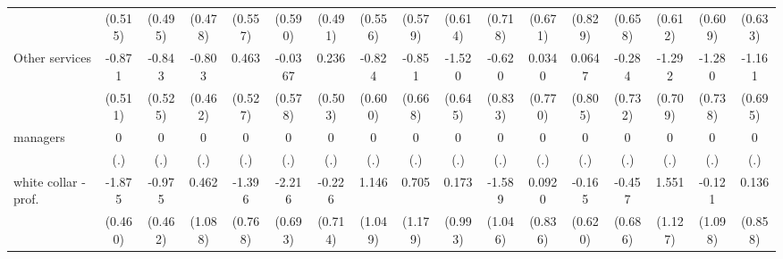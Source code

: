 {\begin{tabular}{l*{16}{c}}
                    &     (0.515)         &     (0.495)         &     (0.478)         &     (0.557)         &     (0.590)         &     (0.491)         &     (0.556)         &     (0.579)         &     (0.614)         &     (0.718)         &     (0.671)         &     (0.829)         &     (0.658)         &     (0.612)         &     (0.609)         &     (0.633)         \\
[1em]
Other services      &      -0.871         &      -0.843         &      -0.803         &       0.463         &     -0.0367         &       0.236         &      -0.824         &      -0.851         &      -1.520\sym{*}  &      -0.620         &      0.0340         &      0.0647         &      -0.284         &      -1.292         &      -1.280         &      -1.161         \\
                    &     (0.511)         &     (0.525)         &     (0.462)         &     (0.527)         &     (0.578)         &     (0.503)         &     (0.600)         &     (0.668)         &     (0.645)         &     (0.833)         &     (0.770)         &     (0.805)         &     (0.732)         &     (0.709)         &     (0.738)         &     (0.695)         \\
[1em]
managers            &           0         &           0         &           0         &           0         &           0         &           0         &           0         &           0         &           0         &           0         &           0         &           0         &           0         &           0         &           0         &           0         \\
                    &         (.)         &         (.)         &         (.)         &         (.)         &         (.)         &         (.)         &         (.)         &         (.)         &         (.)         &         (.)         &         (.)         &         (.)         &         (.)         &         (.)         &         (.)         &         (.)         \\
[1em]
white collar - prof.&      -1.875\sym{***}&      -0.975\sym{*}  &       0.462         &      -1.396         &      -2.216\sym{**} &      -0.226         &       1.146         &       0.705         &       0.173         &      -1.589         &      0.0920         &      -0.165         &      -0.457         &       1.551         &      -0.121         &       0.136         \\
                    &     (0.460)         &     (0.462)         &     (1.088)         &     (0.768)         &     (0.693)         &     (0.714)         &     (1.049)         &     (1.179)         &     (0.993)         &     (1.046)         &     (0.836)         &     (0.620)         &     (0.686)         &     (1.127)         &     (1.098)         &     (0.858)         \\

\end{tabular}}
